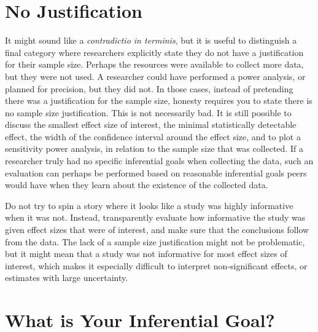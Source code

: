 \documentclass[
  oneside]{book}
\begin{document}
\hypertarget{no-justification}{%
\section{No Justification}\label{no-justification}}

It might sound like a \emph{contradictio in terminis}, but it is useful to distinguish a final category where researchers explicitly state they do not have a justification for their sample size. Perhaps the resources were available to collect more data, but they were not used. A researcher could have performed a power analysis, or planned for precision, but they did not. In those cases, instead of pretending there was a justification for the sample size, honesty requires you to state there is no sample size justification. This is not necessarily bad. It is still possible to discuss the smallest effect size of interest, the minimal statistically detectable effect, the width of the confidence interval around the effect size, and to plot a sensitivity power analysis, in relation to the sample size that was collected. If a researcher truly had no specific inferential goals when collecting the data, such an evaluation can perhaps be performed based on reasonable inferential goals peers would have when they learn about the existence of the collected data.

Do not try to spin a story where it looks like a study was highly informative when it was not. Instead, transparently evaluate how informative the study was given effect sizes that were of interest, and make sure that the conclusions follow from the data. The lack of a sample size justification might not be problematic, but it might mean that a study was not informative for most effect sizes of interest, which makes it especially difficult to interpret non-significant effects, or estimates with large uncertainty.

\hypertarget{what-is-your-inferential-goal}{%
\section{What is Your Inferential Goal?}\label{what-is-your-inferential-goal}}
\end{document}
